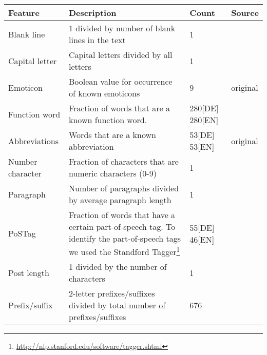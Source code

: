 \begin{savenotes}
\begin{table}[ht!]
    \begin{center}
    \begin{tabular}{p{2.6cm}|p{6cm}|p{1.2cm}|p{1.2cm}}
    Feature                 & Description                                                               & Count             & Source\\ \hline \hline
    Blank line               & 1 divided by number of blank lines in the text                            & 1                 & \cite{de2001mining}\\ \hline
    Capital letter           & Capital letters divided by all letters                                    & 1                 & \cite{argamon2003style} \cite{de2001mining}\\ \hline
    Emoticon                & Boolean value for occurrence of known emoticons                           & 9                 & original\\ \hline
    Function word            & Fraction of words that are a known function word.                         & 280[DE] 280[EN]   & \cite{argamon2003style} \cite{de2001mining} \cite{madigan2005author} \cite{narayanan2012feasibility}\\ \hline
    Abbreviations           & Words that are a known abbreviation                                       & 53[DE] 53[EN]     & original\\ \hline
    Number character         & Fraction of characters that are numeric characters (0-9)                  & 1                 & \cite{narayanan2012feasibility}\\ \hline
    Paragraph               & Number of paragraphs divided by average paragraph length                  & 1                 & \cite{argamon2003style}\\ \hline
    PoSTag                  & Fraction of words that have a certain part-of-speech tag. To identify the part-of-speech tags we used the Standford Tagger\footnote{\url{http://nlp.stanford.edu/software/tagger.shtml}}
                                                                                                        & 55[DE] 46[EN]     & \cite{madigan2005author}\\ \hline
    Post length              & 1 divided by the number of characters                                     & 1                 & \cite{narayanan2012feasibility}\\ \hline
    Prefix/suffix            & 2-letter prefixes/suffixes divided by total number of prefixes/suffixes   & 676               & \cite{madigan2005author}\\ \hline

\end{tabular}
\end{center}
\end{table}
\end{savenotes}
